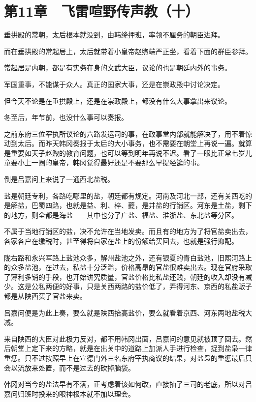 \section{第11章　飞雷喧野传声教（十）}

垂拱殿的常朝，太后根本就没到，由韩绛押班，率领不厘务的朝臣进拜。

而在垂拱殿的常起居上，太后就带着小皇帝赵煦端严正坐，看着下面的群臣参拜。

常起居是内朝，都是有实务在身的文武大臣，议论的也是朝廷内外的事务。

军国重事，不能谋于众人。真正的国家大事，还是在崇政殿中讨论决定。

但今天不论是在垂拱殿上，还是在崇政殿上，都没有什么大事拿出来议论。

冬至后，年节前，也没什么事可以奏报。

之前东府三位宰执所议论的六路发运司的事，在政事堂内部就能解决了，用不着惊动到太后。而昨天韩冈奏报于太后的大小事务，也不需要在朝堂上再说一遍。就算是重要如天子赵煦的教育问题，也可以等到明年再说不迟。看了一眼比正常七岁儿童要小上一圈的皇帝，韩冈觉得最好还是不要那么早提经筵的事。

倒是吕嘉问上来说了一通西北盐税。

盐是朝廷专利，各路吃哪里的盐，朝廷都有规定。河南及河北一部，还有关西吃的是解盐，巴蜀四路，也就是益、利、梓、夔，是井盐的行销区。河东是土盐，剩下的地方，则全都是海盐——其中也分了广盐、福盐、淮浙盐、东北盐等分区。

不属于当地行销区的盐，决不允许在当地发卖。而且有的地方为了将官盐卖出去，各家各户在缴税时，甚至得将自家在盐上的份额给买回去，也就是强行抑配。

陇右路和永兴军路上盐池众多，解州盐池之外，还有银夏的青白盐池，旧熙河路上的众多盐池，在过去，私盐十分泛滥，价格高昂的官盐很难卖出去。现在官府采取了薄利多销的手段，也开始讲究质量，官盐价格比私盐还贱，朝廷的收入却没有减少。这是公私两便的好事，只是关西两路的盐价低了，弄得河东、京西的私盐贩子都是从陕西买了官盐来卖。

吕嘉问便是为此上奏，要么就是陕西抬高盐价，要么就看着京西、河东两地盐税大减。

来自陕西的大臣对此极力反对，都不用韩冈出面，吕嘉问的意见就被顶了回去。然后朝堂上定下来的方略，就是在出关中的道路上加派人手进行检查，捉到盐枭一律重惩。只不过按照早上在宣德门外三名东府宰执商议的结果，对盐枭的重惩最后只会以流放来处置，而不是过去的砍掉脑袋。

韩冈对当今的盐法早有不满，正考虑着该如何改，直接抽了三司的老底，所以对吕嘉问归班时投来的眼神根本就不加以理会。

